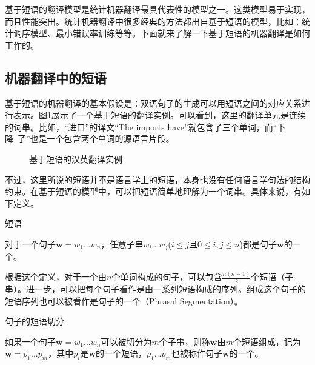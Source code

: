 \parinterval 基于短语的翻译模型是统计机器翻译最具代表性的模型之一\cite{koehn2003statistical,chiang2007hierarchical}。这类模型易于实现，而且性能突出。统计机器翻译中很多经典的方法都出自基于短语的模型，比如：统计调序模型、最小错误率训练等等。下面就来了解一下基于短语的机器翻译是如何工作的。


\subsection{机器翻译中的短语}

\parinterval 基于短语的机器翻译的基本假设是：双语句子的生成可以用短语之间的对应关系进行表示。图\ref{fig:4-9}展示了一个基于短语的翻译实例。可以看到，这里的翻译单元是连续的词串。比如，``进口''的译文``The imports have''就包含了三个单词，而``下降\ 了''也是一个包含两个单词的源语言片段。

\begin{figure}[htp]
\centering

\caption{基于短语的汉英翻译实例}
\label{fig:4-9}
\end{figure}

\parinterval 不过，这里所说的短语并不是语言学上的短语，本身也没有任何语言学句法的结构约束。在基于短语的模型中，可以把短语简单地理解为一个词串。具体来说，有如下定义。

\vspace{0.5em}
\begin{definition} 短语

{\small
对于一个句子$\mathbf{w} = w_1...w_n$，任意子串$w_i...w_j$($i\leq j$且$0\leq i,j\leq n$)都是句子$\mathbf{w}$的一个{\small{}}。
}
\end{definition}

\parinterval 根据这个定义，对于一个由$n$个单词构成的句子，可以包含$\frac{n(n-1)}{2}$个短语（子串）。进一步，可以把每个句子看作是由一系列短语构成的序列。组成这个句子的短语序列也可以被看作是句子的一个{\small{}}（Phrasal Segmentation）。

\vspace{0.5em}
\begin{definition} 句子的短语切分

{\small
如果一个句子$\mathbf{w} = w_1...w_n$可以被切分为$m$个子串，则称$\mathbf{w}$由$m$个短语组成，记为$\mathbf{w} = p_1...p_m$，其中$p_i$是$\mathbf{w}$的一个短语，$p_1...p_m$也被称作句子$\mathbf{w}$的一个{\small{}}。
}
\end{definition}

